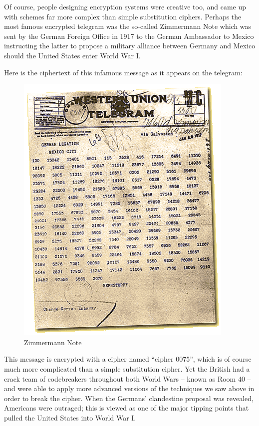\documentclass[UTF8]{book}
\begin{document}
\begin{CJK}{UTF8}{gbsn}
Of course, people designing encryption systems were creative too, and came up with schemes far more complex than simple substitution ciphers. Perhaps the most famous encrypted telegram was the so-called Zimmermann Note which was sent by the German Foreign Office in 1917 to the German Ambassador to Mexico instructing the latter to propose a military alliance between Germany and Mexico should the United States enter World War I.

Here is the ciphertext of this infamous message as it appears on the telegram:

\begin{figure}[H]
\centering
\includegraphics[width=0.8\linewidth]{zimmermann}
\caption{Zimmermann Note}
\end{figure}

This message is encrypted with a cipher named ``cipher 0075'', which is of course much more complicated than a simple substitution cipher. Yet the British had a crack team of codebreakers throughout both World Wars – known as Room 40 – and were able to apply more advanced versions of the techniques we saw above in order to break the cipher. When the Germans' clandestine proposal was revealed, Americans were outraged; this is viewed as one of the major tipping points that pulled the United States into World War I.


\end{CJK}
\end{document}
